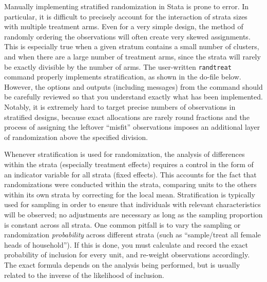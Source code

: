 Manually implementing stratified randomization in Stata is prone to error.
In particular, it is difficult to precisely account
for the interaction of strata sizes with multiple treatment arms.
Even for a very simple design, the method of randomly ordering the observations
will often create very skewed assignments.
This is especially true when a given stratum contains a small number of clusters,
and when there are a large number of treatment arms,
since the strata will rarely be exactly divisible by the number of arms.\cite{carril2017dealing}
The user-written \texttt{randtreat} command properly implements stratification, 
as shown in the do-file below. 
However, the options and outputs (including messages) from the command should be carefully reviewed
so that you understand exactly what has been implemented.
Notably, it is extremely hard to target precise numbers of observations
in stratified designs, because exact allocations are rarely round fractions
and the process of assigning the leftover ``misfit'' observations
imposes an additional layer of randomization above the specified division.


Whenever stratification is used for randomization,
the analysis of differences within the strata (especially treatment effects)
requires a control in the form of an indicator variable for all strata (fixed effects).
This accounts for the fact that randomizations were conducted within the strata,
comparing units to the others within its own strata by correcting for the local mean.
Stratification is typically used for sampling
in order to ensure that individuals with relevant characteristics will be observed;
no adjustments are necessary as long as the sampling proportion is constant across all strata.
One common pitfall is to vary the sampling or randomization \textit{probability}
across different strata (such as ``sample/treat all female heads of household'').
If this is done, you must calculate and record the exact probability
of inclusion for every unit, and re-weight observations accordingly.
The exact formula depends on the analysis being performed,
but is usually related to the inverse of the likelihood of inclusion.

